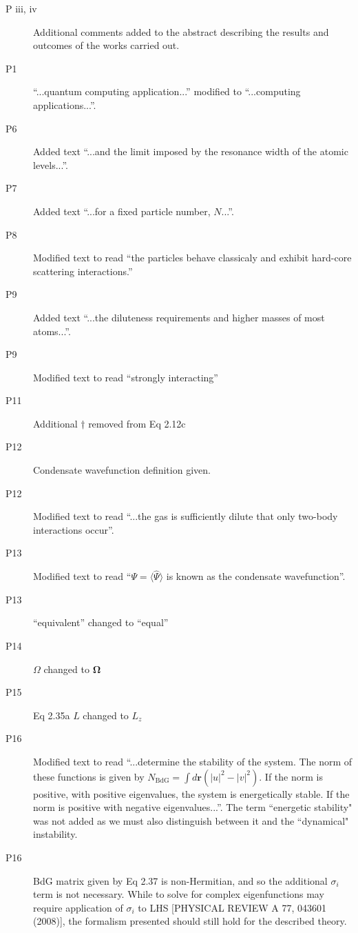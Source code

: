 \documentclass[paper=a4, fontsize=12pt]{scrartcl}
\begin{document}
\begin{description}
    \item [P iii, iv] Additional comments added to the abstract describing the results and outcomes of the works carried out.
    \item [P1] ``...quantum computing application...'' modified to ``...computing applications...''.
    \item [P6] Added text ``...and the limit imposed by the resonance width of the atomic levels...''.
    \item [P7] Added text ``...for a fixed particle number, $N$...''.
    \item [P8] Modified text to read ``the particles behave classicaly and exhibit hard-core scattering interactions.''
    \item [P9] Added text ``...the diluteness requirements and higher masses of most atoms...''.
    \item [P9] Modified text to read ``strongly interacting''
    \item [P11] Additional $\dagger$ removed from Eq 2.12c
    \item [P12] Condensate wavefunction definition given.
    \item [P12] Modified text to read ``...the gas is sufficiently dilute that only two-body interactions occur''.
    \item [P13] Modified text to read ``$\Psi = \langle \hat{\Psi} \rangle$ is known as the condensate wavefunction''.
    \item [P13] ``equivalent'' changed to ``equal''
    \item [P14] $\Omega$ changed to $\mathbf{\Omega}$
    \item [P15] Eq 2.35a $L$ changed to $L_z$
    \item [P16] Modified text to read ``...determine the stability of the system. The norm of these functions is given by $N_{\textrm{BdG}}=\int d\mathbf{r}(|u|^2 - |v|^2)$. If the norm is positive, with positive eigenvalues, the system is energetically stable. If the norm is positive with negative eigenvalues...''. The term ``energetic stability" was not added as we must also distinguish between it and the ``dynamical" instability.
    \item [P16] BdG matrix given by Eq 2.37 is non-Hermitian, and so the additional $\sigma_i$ term is not necessary. While to solve for complex eigenfunctions may require application of $\sigma_i$ to LHS [PHYSICAL REVIEW A 77, 043601 (2008)], the formalism presented should still hold for the described theory.

\end{description}
\end{document}
